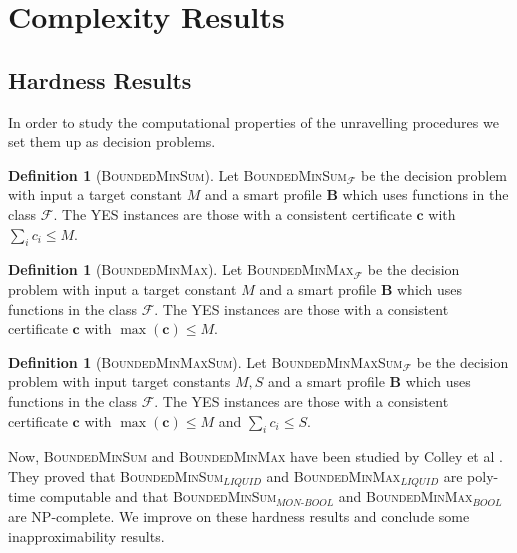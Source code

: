 \documentclass[11pt,a4paper, titlepage]{article}
\theoremstyle{definition}
\newtheorem{definition}[theorem]{Definition}
\let\vec\mathbf
\begin{document}
\newpage



\section{Complexity Results}

\subsection{Hardness Results}

In order to study the computational properties of the unravelling procedures we set them up as decision problems.

\begin{definition}[\textsc{BoundedMinSum}]
    Let \textsc{BoundedMinSum}$_\mathcal{F}$ be the decision problem with input a target constant $M$ and a smart profile $\mathbf{B}$ which uses functions in the class $\mathcal{F}$. 
    The YES instances are those with a consistent certificate  $\vec{c}$ with $\sum_i c_i \leq M$. 
\end{definition}

\begin{definition}[\textsc{BoundedMinMax}]
    Let \textsc{BoundedMinMax}$_\mathcal{F}$ be the decision problem with input a target constant $M$ and a smart profile $\mathbf{B}$ which uses functions in the class $\mathcal{F}$. The YES instances are those with a consistent certificate  $\vec{c}$ with $\max(\vec{c}) \leq M$. 
\end{definition}

\begin{definition}[\textsc{BoundedMinMaxSum}]
    Let \textsc{BoundedMinMaxSum}$_\mathcal{F}$ be the decision problem with input target constants $M, S$ and a smart profile $\mathbf{B}$ which uses functions in the class $\mathcal{F}$. The YES instances are those with a consistent certificate  $\vec{c}$ with $\max (\vec{c}) \leq M$ and $\sum_i c_i \leq S$.
\end{definition}


Now, \textsc{BoundedMinSum} and \textsc{BoundedMinMax} have been studied by Colley et al \cite{grandi}.
They proved that \textsc{BoundedMinSum}$_\mathit{LIQUID}$ and \textsc{BoundedMinMax}$_\mathit{LIQUID}$ are poly-time computable and that \textsc{BoundedMinSum}$_\mathit{MON\text{-}BOOL}$ and \textsc{BoundedMinMax}$_\mathit{BOOL}$ are NP-complete.
We improve on these hardness results and conclude some inapproximability results.
\end{document}
